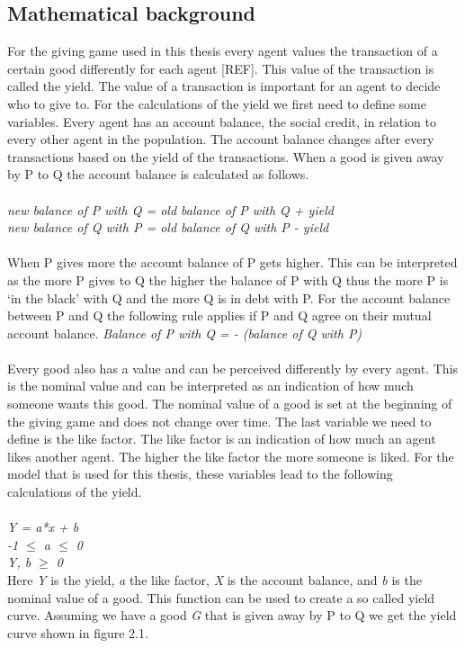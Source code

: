 \documentclass[twoside,openright]{uva-bachelor-thesis}
\begin{document}
\subsection{Mathematical background}
For the giving game used in this thesis every agent values the transaction of a certain good differently for each agent [REF]. This value of the transaction is called the yield. The value of a transaction is important for an agent to decide who to give to. For the calculations of the yield we first need to define some variables. Every agent has an account balance, the social credit, in relation to every other agent in the population. The account balance changes after every transactions based on the yield of the transactions. When a good is given away by P to Q the account balance is calculated as follows.\\
\\
\textit{new balance of P with Q = old balance of P with Q + yield} \\
\textit{new balance of Q with P = old balance of Q with P - yield} \\
\\
When P gives more the account balance of P gets higher. This can be interpreted as the more P gives to Q the higher the balance of P with Q thus the more P is ‘in the black’ with Q and the more Q is in debt with P. 
For the account balance between P and Q the following rule applies if P and Q agree on their mutual account balance.
\textit{Balance of P with Q = - (balance of Q with P)}
\\
\\
Every good also has a value and can be perceived differently by every agent. This is the nominal value and can be interpreted as an indication of how much someone wants this good. The nominal value of a good is set at the beginning of the giving game and does not change over time. The last variable we need to define is the like factor. The like factor is an indication of how much an agent likes another agent. The higher the like factor the more someone is liked.
For the model that is used for this thesis, these variables lead to the following calculations of the yield.
\\
\\
\textit{Y = a*x + b} \\
\textit{-1 $\le$ a $\le$ 0} \\
\textit{Y, b $\ge$ 0} \\
Here \textit{Y} is the yield, \textit{a} the like factor, \textit{X} is the account balance, and \textit{b} is the nominal value of a good. This function can be used to create a so called yield curve. Assuming we have a good \textit{G} that is given away by P to Q we get the yield curve shown in figure 2.1.
\end{document}
